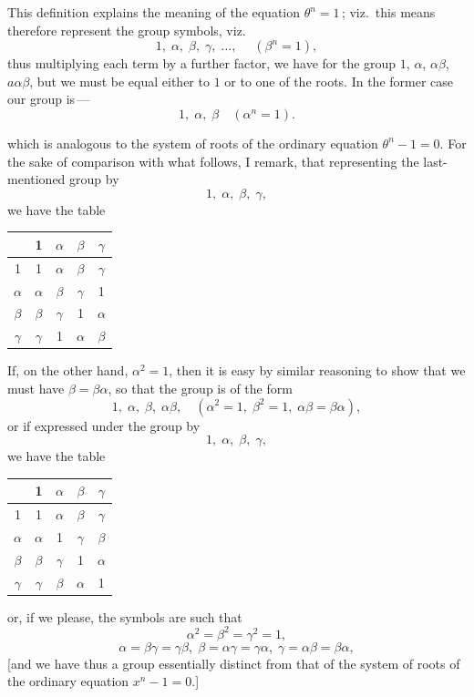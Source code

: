 \documentclass[11pt,a4paper]{book}
\begin{document}
\medskip

This definition explains the meaning of the equation $\theta^n=1$\,; viz.\ this means therefore
represent the group symbols, viz.\
\[
1,\;\alpha,\;\beta,\;\gamma,\;\ldots,\;\quad (\beta^n = 1),
\]
thus multiplying each term by a further factor, we have for the group $1$, $\alpha$, $\alpha\beta$,
$a\alpha\beta$, but we must be equal either to $1$ or to one of the roots. In the former case our
group is\,---
\[
1,\;\alpha,\;\beta\quad(\alpha^n=1).
\]

\noindent which is analogous to the system of roots of the ordinary equation $\theta^n - 1 = 0$. For
the sake of comparison with what follows, I remark, that representing the last-
mentioned group by
\[
1,\;\alpha,\;\beta,\;\gamma,
\]
we have the table
\medskip
\begin{center}
\begin{tabular}{c|cccc}
 & 1 & $\alpha$ & $\beta$ & $\gamma$ \\\hline
1 & 1 & $\alpha$ & $\beta$ & $\gamma$ \\
$\alpha$ & $\alpha$ & $\beta$ & $\gamma$ & 1 \\
$\beta$ & $\beta$ & $\gamma$ & 1 & $\alpha$ \\
$\gamma$ & $\gamma$ & 1 & $\alpha$ & $\beta$
\end{tabular}
\end{center}

\medskip

If, on the other hand, $\alpha^2=1$, then it is easy by similar reasoning to show that we
must have $\beta=\beta\alpha$, so that the group is of the form
\[
1,\;\alpha,\;\beta,\;\alpha\beta,\quad(\alpha^2=1,\;\beta^2=1,\;\alpha\beta=\beta\alpha),
\]
or if expressed under the group by
\[
1,\;\alpha,\;\beta,\;\gamma,
\]
we have the table
\medskip
\begin{center}
\begin{tabular}{c|cccc}
 & 1 & $\alpha$ & $\beta$ & $\gamma$ \\\hline
1 & 1 & $\alpha$ & $\beta$ & $\gamma$ \\
$\alpha$ & $\alpha$ & 1 & $\gamma$ & $\beta$ \\
$\beta$ & $\beta$ & $\gamma$ & 1 & $\alpha$ \\
$\gamma$ & $\gamma$ & $\beta$ & $\alpha$ & 1
\end{tabular}
\end{center}

\medskip

or, if we please, the symbols are such that
\[
\alpha^2 = \beta^2 = \gamma^2 = 1,
\]
\[
\alpha = \beta\gamma = \gamma\beta,\;\beta = \alpha\gamma = \gamma\alpha,\;\gamma = \alpha\beta = \beta\alpha,
\]
[and we have thus a group essentially distinct from that of the system of roots of
the ordinary equation $x^n - 1 = 0$.]
\end{document}

